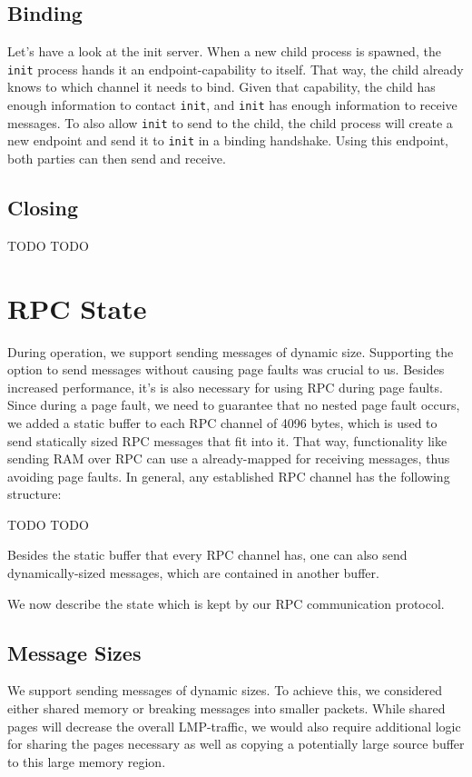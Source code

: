 \subsection{Binding}
Let's have a look at the init server.
When a new child process is spawned, the \texttt{init} process hands it an endpoint-capability
to itself. That way, the child already knows to which channel it needs to bind. 
Given that capability, the child has enough information to contact \texttt{init}, and 
\texttt{init} has enough information to receive messages. To also allow \texttt{init}
to send to the child, the child process will create a new endpoint and send it to \texttt{init}
in a binding handshake. Using this endpoint, both parties can then send and receive.

\subsection{Closing}
TODO TODO

\section{RPC State}
During operation, we support sending messages of dynamic size.
Supporting the option to send messages without causing page faults was crucial 
to us. Besides increased performance, it's is also necessary for using RPC 
during page faults. Since during a page fault, we need to guarantee that no 
nested page fault occurs, we added a static buffer to each RPC channel of 4096 bytes, 
which is used to send statically sized RPC messages that fit into it.
That way, functionality like sending RAM over RPC can use a already-mapped for 
receiving messages, thus avoiding page faults. In general, any established 
RPC channel has the following structure:

TODO TODO 

Besides the static buffer that every RPC channel has, one can also send 
dynamically-sized messages, which are contained in another buffer.




We now describe the state which is kept by our RPC communication protocol.

\subsection{Message Sizes}
We support sending messages of dynamic sizes. To achieve this, we considered 
either shared memory or breaking messages into smaller packets.
While shared pages will decrease the overall LMP-traffic, we would also 
require additional logic for sharing the pages necessary as well as 
copying a potentially large source buffer to this large memory region.

